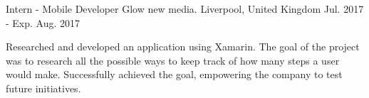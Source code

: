 \begin{cventries}
  \cventry
    {Intern - Mobile Developer} %
    {Glow new media.} %
    {Liverpool, United Kingdom} %
    {Jul. 2017 - Exp. Aug. 2017} %
    {
      \begin{cvitems} %
        \item {Researched and developed an application using Xamarin. The goal of the project was to research all the possible ways to keep track of how many steps a user would make. Successfully achieved the goal, empowering the company to test future initiatives.}
      \end{cvitems}
    }


\end{cventries}
